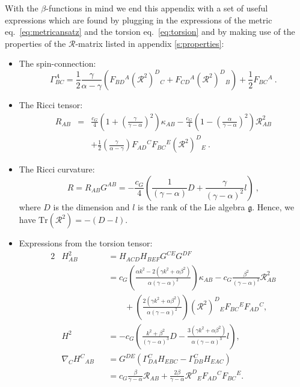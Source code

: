 \documentclass[12pt]{article}
\def\RR{{\mathfrak R}}
\def\RR{{\mathfrak R}}
\def\R{{\mathbb R}}
\renewcommand{\R}{\mathcal{R}}
\renewcommand{\RR}{(\mathcal{R}^{2})}
\begin{document}
With the $\beta$-functions in mind we end this appendix with a set of useful expressions which are found by plugging in the expressions of the metric eq.~\eqref{eq:metricansatz} and the torsion eq.~\eqref{eq:torsion} and by making use of the properties of the $\R$-matrix listed in appendix \ref{s:properties}:  
\begin{itemize}
\item The spin-connection: 
\begin{equation}\label{eq:conngenglie}
\Gamma^{A}_{BC} = \frac{1}{2}\frac{\gamma}{\alpha - \gamma}\left(F_{BD}{}^{A}\RR^{D}{}_{C} + F_{CD}{}^{A}\RR^{D}{}_{B} \right) + \frac{1}{2}F_{BC}{}^{A} \ . 
\end{equation}
\item The Ricci tensor: \begin{eqnarray}
R_{AB} &=& \frac{c_G}{4}\left( 1 + \left(\frac{\gamma}{\gamma-\alpha} \right)^{2}\right)\kappa_{AB} - \frac{c_G}{4}\left(1-\left(\frac{\alpha}{\gamma-\alpha}\right)^{2} \right) \R^{2}_{AB} \nonumber\\
&&
 +\frac{1}{2}\left(\frac{\gamma}{\alpha-\gamma}\right) F_{AD}{}^{C}F_{BC}{}^{E}\RR^{D}{}_{E}   \ . 
\end{eqnarray}
\item The Ricci curvature: \begin{equation}\label{eq:riccicurv}
R = R_{AB} G^{AB} = -\frac{c_G}{4} \left(\frac{1}{(\gamma-\alpha)}D +\frac{\gamma}{(\gamma - \alpha)^{2}}l\right) \ ,
\end{equation}
where $D$ is the dimension and $l$ is the rank of the Lie algebra $\mathfrak{g}$. Hence, we have $\mathrm{Tr} \RR = - (D-l)$.
\item Expressions from the torsion tensor: 
\begin{alignat}{2}
&H^{2}_{AB} &&= H_{ACD}H_{BEF}G^{CE}G^{DF}\nonumber\\
& &&=c_G \left( \frac{\alpha k^{2} - 2(\gamma k^{2} +\alpha\beta^{2})}{\alpha(\gamma - \alpha)^{2}} \right) \kappa_{AB} -c_G \frac{\beta^{2}}{(\gamma - \alpha)^{2}} \R^{2}_{AB}\nonumber\\& &&\qquad +\left( \frac{2(\gamma k^{2}+\alpha\beta^{2})}{\alpha(\gamma - \alpha)^{2}}\right)\RR^{D}{}_{E} F_{BC}{}^{E}F_{AD}{}^{C},\\
&H^{2} &&= -c_G \left( \frac{ k^{2}+\beta^{2}}{(\gamma-\alpha)^{3}}D -\frac{3(\gamma k^{2}+\alpha \beta^{2})}{\alpha(\gamma-\alpha)^{3}}l \right), \\
&\nabla_C H^{C}{}_{AB} &&= G^{DE} \left(\Gamma^{C}_{DA}H_{EBC} - \Gamma^{C}_{DB} H_{EAC} \right) \nonumber\\
& &&= c_G \frac{\beta}{\gamma - \alpha} \R_{AB} + \frac{2\beta}{\gamma-\alpha} \R^{D}{}_{E} F_{AD}{}^C F_{BC}{}^E .
\end{alignat}
\end{itemize}
\end{document}
